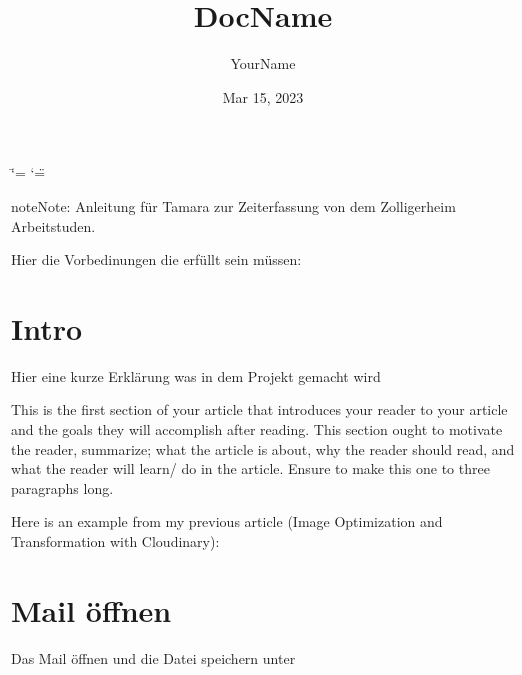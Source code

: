 \documentclass[letterpaper,10pt,english]{sphinxmanual}
\title{DocName}
\date{Mar 15, 2023}
\author{YourName}
\begin{document}
\ifdefined\shorthandoff
  \ifnum\catcode`\=\string=\active\shorthandoff{=}\fi
  \ifnum\catcode`\"=\active{}\fi
\fi

\pagestyle{empty}
\sphinxmaketitle
\pagestyle{plain}
\sphinxtableofcontents
\pagestyle{normal}
\label{\detokenize{index::doc}}


\begin{sphinxadmonition}{note}{Note:}
\sphinxAtStartPar
Anleitung für Tamara zur Zeiterfassung
von dem Zolligerheim Arbeitstuden.
\end{sphinxadmonition}

\sphinxAtStartPar
Hier die Vorbedinungen die erfüllt sein müssen:

\begin{sphinxVerbatim}[commandchars=\\\{\}]
    
\end{sphinxVerbatim}

\sphinxstepscope


\chapter{Intro}
\label{\detokenize{intro:intro}}\label{\detokenize{intro::doc}}
\sphinxAtStartPar
Hier eine kurze Erklärung was
in dem Projekt gemacht wird

\sphinxAtStartPar
This is the first section of your article that introduces your reader to your article and the goals they will accomplish after reading. This section ought to motivate the reader, summarize; what the article is about, why the reader should read, and what the reader will learn/ do in the article. Ensure to make this one to three paragraphs long.

\sphinxAtStartPar
Here is an example from my previous article (Image Optimization and Transformation with Cloudinary):

\sphinxstepscope


\chapter{Mail öffnen}
\label{\detokenize{intro_01:mail-offnen}}\label{\detokenize{intro_01::doc}}
\sphinxAtStartPar
Das Mail öffnen und die Datei speichern unter

\begin{sphinxVerbatim}[commandchars=\\\{\}]
\end{sphinxVerbatim}
\end{document}
